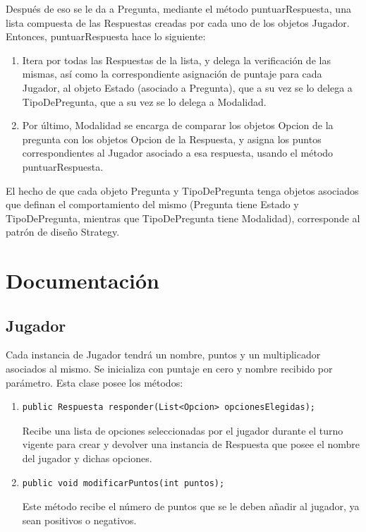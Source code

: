 \documentclass[titlepage,a4paper]{article}
\begin{document}
Después de eso se le da a Pregunta, mediante el método puntuarRespuesta, una lista compuesta de las Respuestas creadas por cada uno de los objetos Jugador. Entonces, puntuarRespuesta hace lo siguiente:
\begin{enumerate}
\item Itera por todas las Respuestas de la lista, y delega la verificación de las mismas, así como la correspondiente asignación de puntaje para cada Jugador, al objeto Estado (asociado a Pregunta), que a su vez se lo delega a TipoDePregunta, que a su vez se lo delega a Modalidad.
\item Por último, Modalidad se encarga de comparar los objetos Opcion de la pregunta con los objetos Opcion de la Respuesta, y asigna los puntos correspondientes al Jugador asociado a esa respuesta, usando el método puntuarRespuesta.
\end{enumerate}

El hecho de que cada objeto Pregunta y TipoDePregunta tenga objetos asociados que definan el comportamiento del mismo (Pregunta tiene Estado y TipoDePregunta, mientras que TipoDePregunta tiene Modalidad), corresponde al patrón de diseño Strategy.


\section{Documentación}

\subsection{Jugador}
Cada instancia de Jugador tendrá un nombre, puntos y un multiplicador asociados al mismo. Se inicializa con puntaje en cero y nombre recibido por parámetro. Esta clase posee los métodos:
\begin{enumerate}
\item \begin{verbatim}public Respuesta responder(List<Opcion> opcionesElegidas);\end{verbatim} Recibe una lista de opciones seleccionadas por el jugador durante el turno vigente para crear y devolver una instancia de Respuesta que posee el nombre del jugador y dichas opciones. 
\item \begin{verbatim}public void modificarPuntos(int puntos);\end{verbatim} Este método recibe el número de puntos que se le deben añadir al jugador, ya sean positivos o negativos. 
\end{enumerate}
\end{document}
